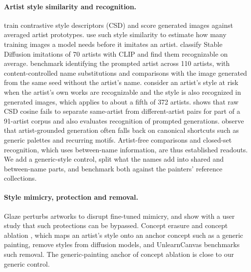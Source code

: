 \documentclass[10pt]{article}
\begin{document}
\paragraph{Artist style similarity and recognition.}
\citet{somepalli2024style} train contrastive style descriptors (CSD) and score generated images
against averaged artist prototypes. \citet{verma2025imitation} use such style similarity to
estimate how many training images a model needs before it imitates an artist.
\citet{casper2023measuring} classify Stable Diffusion imitations of 70 artists with CLIP and find
them recognizable on average. \citet{su2025prompted} benchmark identifying the prompted artist
across 110 artists, with content-controlled name substitutions and comparisons with the image
generated from the same seed without the artist's name. \citet{moayeri2025rethinking} consider an
artist's style at risk when the artist's own works are recognizable and the style is also
recognized in generated images, which applies to about a fifth of 372 artists.
\citet{frochte2026csd} shows that raw CSD cosine fails to separate same-artist from
different-artist pairs for part of a 91-artist corpus and also evaluates recognition of prompted
generations. \citet{xing2026beyond} observe that artist-grounded generation often falls back on
canonical shortcuts such as generic palettes and recurring motifs. Artist-free comparisons and
closed-set recognition, which uses between-name information, are thus established readouts. We add
a generic-style control, split what the names add into shared and between-name parts, and
benchmark both against the painters' reference collections.

\paragraph{Style mimicry, protection and removal.}
Glaze \citep{shan2023glaze} perturbs artworks to disrupt fine-tuned mimicry, and
\citet{honig2025adversarial} show with a user study that such protections can be bypassed.
Concept erasure \citep{gandikota2023erasing} and concept ablation \citep{kumari2023ablating},
which maps an artist's style onto an anchor concept such as a generic painting, remove styles
from diffusion models, and UnlearnCanvas \citep{zhang2024unlearncanvas} benchmarks such removal.
The generic-painting anchor of concept ablation is close to our generic control.
\end{document}
